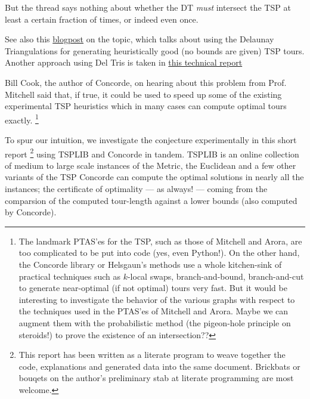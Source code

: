 \begin{description}
     But the thread says nothing about whether the DT \textit{must} intersect the TSP at least a certain fraction of times, or indeed even once.  

     See also this \href{https://web.colby.edu/thegeometricviewpoint/2015/03/09/delauney-triangulations-and-the-traveling-salesman/}{blogpost} on the topic, which 
     talks about using the Delaunay Triangulations for generating heuristically good (no bounds are given) TSP tours. Another approach using Del Tris
     is taken in \href{https://www.researchgate.net/publication/215753374_An_On_log_n_Heuristic_for_the_Euclidean_Traveling_Salesman_Problem}{this technical report} 

     Bill Cook, the author of Concorde\cite{applegate2009certification},  on hearing about this problem from Prof. Mitchell said that, if true, it could be used 
     to speed up some of the existing experimental TSP heuristics which in many cases can compute optimal tours exactly. 
     \footnote{The landmark PTAS'es for the TSP, such as those of Mitchell \cite{mitchell1999guillotine} and Arora\cite{arora1996polynomial},  are too complicated to be put into code (yes, even Python!). On the other hand, the Concorde library \cite{applegate2009certification} or Helsgaun's methods\cite{helsgaun2000effective}  use a whole kitchen-sink of practical techniques such as $k$-local swaps, branch-and-bound, branch-and-cut to generate  near-optimal (if not optimal) tours very fast. But it would be interesting to investigate the behavior of the various graphs with respect to the techniques used in the PTAS'es of Mitchell and Arora. Maybe we can augment them with the probabilistic method (the pigeon-hole principle on steroids!) to prove the existence of an intersection??}

     To spur our intuition,  we investigate the conjecture experimentally in this short report 
     \footnote{This report has been written as a literate program \cite{knuth1984literate,ramsey2008noweb} to weave together the code, explanations and generated data into the same document. Brickbats or bouqets on the author's preliminary stab at literate programming are most welcome.}
     using TSPLIB and Concorde in tandem. TSPLIB \cite{reinelt1991tsplib} is an online collection of medium to large scale instances of the Metric, the Euclidean and a few other variants of the TSP 
     Concorde can compute the optimal solutions in nearly all the instances; the certificate of optimality --- as always! --- coming from the comparsion of the computed tour-length against 
     a lower bounds (also computed by Concorde).


\end{description}
